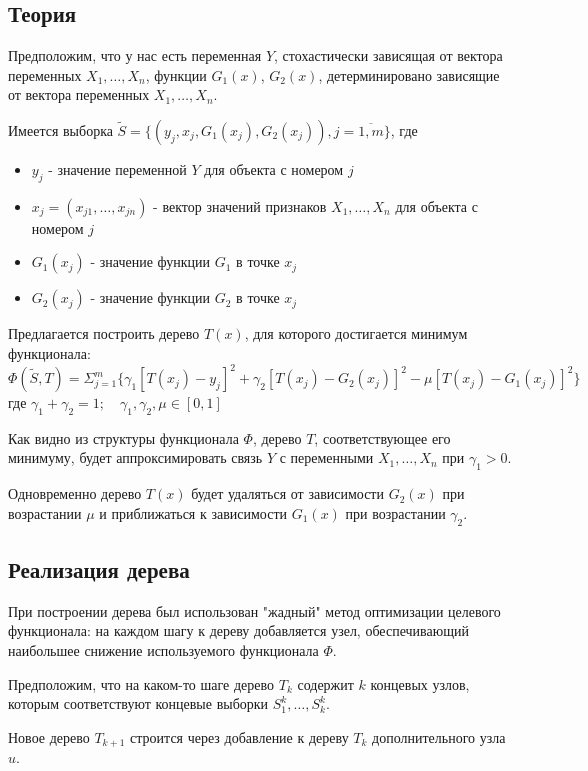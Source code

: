 \documentclass{article}
\begin{document}
\subsection{Теория}

Предположим, что у нас есть переменная $Y$, стохастически зависящая от вектора переменных $X_1, \dots, X_n$, 
функции $G_1(x)$, $G_2(x)$, детерминировано зависящие от вектора переменных $X_1, \dots, X_n$.

Имеется выборка $\tilde{S} = \{ (y_j, x_j, G_1(x_j), G_2(x_j)), j = \overline{1, m} \}$, где
\begin{itemize}
	\item $y_j$ - значение переменной $Y$ для объекта с номером $j$
	\item $x_j = (x_{j1}, \dots, x_{jn})$ - вектор значений признаков $X_1, \dots, X_n$ для объекта с номером $j$
	\item $G_1(x_j)$ - значение функции $G_1$ в точке $x_j$
	\item $G_2(x_j)$ - значение функции $G_2$ в точке $x_j$
\end{itemize}

Предлагается построить дерево $T(x)$, для которого достигается минимум функционала:
$$ \Phi(\tilde{S}, T) = \Sigma_{j=1}^{m} \{ \gamma_1 [T(x_j) - y_j]^2 + \gamma_2 [T(x_j) - G_2(x_j)]^2 - \mu [T(x_j) - G_1(x_j)]^2   \}  $$
где $\gamma_1 + \gamma_2 = 1; \quad \gamma_1, \gamma_2, \mu \in [0, 1] $


Как видно из структуры функционала $\Phi$, дерево $T$, соответствующее его минимуму,  будет аппроксимировать связь $Y$ с переменными $X_1, \dots, X_n$ при $\gamma_1 > 0$.

Одновременно дерево $T(x)$ будет удаляться от зависимости $G_2(x)$ при возрастании $\mu$ и приближаться к зависимости $G_1(x)$ при возрастании $\gamma_2$.


\subsection{Реализация дерева}

При построении дерева был использован "жадный" \space метод оптимизации целевого функционала: на каждом шагу к дереву добавляется узел, обеспечивающий наибольшее снижение используемого функционала $\Phi$.

Предположим, что на каком-то шаге дерево $T_k$ содержит $k$ концевых узлов, которым соответствуют концевые выборки $S_1^k, \dots, S_k^k$.

Новое дерево $T_{k + 1}$ строится через добавление к дереву $T_k$ дополнительного узла $u$.
\end{document}
